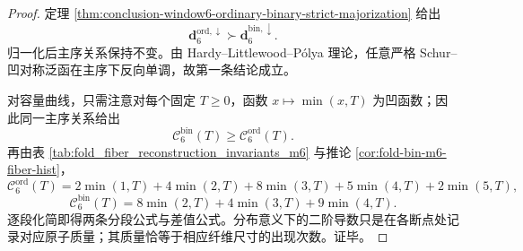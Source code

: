 \begin{proof}
定理 \ref{thm:conclusion-window6-ordinary-binary-strict-majorization} 给出
\[
\mathbf d_6^{\mathrm{ord},\downarrow}\succ \mathbf d_6^{\mathrm{bin},\downarrow}.
\]
归一化后主序关系保持不变。由 Hardy--Littlewood--Pólya 理论，任意严格 Schur--凹对称泛函在主序下反向单调，故第一条结论成立。

对容量曲线，只需注意对每个固定 \(T\ge 0\)，函数 \(x\mapsto \min(x,T)\) 为凹函数；因此同一主序关系给出
\[
\mathcal C_6^{\mathrm{bin}}(T)\ge \mathcal C_6^{\mathrm{ord}}(T).
\]
再由表 \ref{tab:fold_fiber_reconstruction_invariants_m6} 与推论 \ref{cor:fold-bin-m6-fiber-hist}，
\[
\mathcal C_6^{\mathrm{ord}}(T)
=2\min(1,T)+4\min(2,T)+8\min(3,T)+5\min(4,T)+2\min(5,T),
\]
\[
\mathcal C_6^{\mathrm{bin}}(T)
=8\min(2,T)+4\min(3,T)+9\min(4,T).
\]
逐段化简即得两条分段公式与差值公式。分布意义下的二阶导数只是在各断点处记录对应原子质量；其质量恰等于相应纤维尺寸的出现次数。证毕。
\end{proof}

